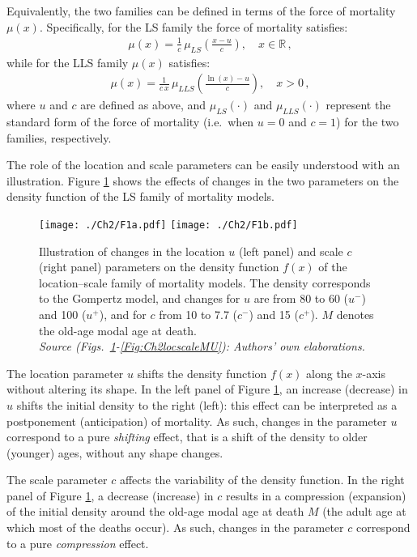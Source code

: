\documentclass[Thesis]{subfiles}
\begin{document}
Equivalently, the two families can be defined in terms of the force of mortality $\mu(x)$. Specifically, for the LS family the force of mortality satisfies:
\begin{eqnarray}\label{LSMmux}
\mu(x)= \frac{1}{c} \, \mu_{LS} \left (\frac{x-u}{c} \right ), \quad x\in\mathbb{R} \, ,
\end{eqnarray}
while for the LLS family $\mu(x)$ satisfies:
\begin{eqnarray}\label{LSLMmux}
\mu(x)=\frac{1}{c\,x} \, \mu_{LLS} \left (\frac{\ln(x)-u}{c} \right ),  \quad x > 0 \, ,
\end{eqnarray}
where $u$ and $c$ are defined as above, and $\mu_{LS}(\cdot)$ and $\mu_{LLS}(\cdot)$ represent the standard form of the force of mortality (i.e.~when $u=0$ and $c=1$) for the two families, respectively.

The role of the location and scale parameters can be easily understood with an illustration. Figure \ref{Fig:Ch2locscalepdf} shows the effects of changes in the two parameters on the density function of the LS family of mortality models. 

\begin{figure}[!ht]
	\centering
	\texttt{[image: ./Ch2/F1a.pdf]}
	\texttt{[image: ./Ch2/F1b.pdf]}
	
	\caption{Illustration of changes in the location $u$ (left panel) and scale $c$ (right panel) parameters on the density function $f(x)$ of the location--scale family of mortality models. The density corresponds to the Gompertz model, and changes for $u$ are from 80 to 60 ($u^-$) and 100 ($u^+$), and for $c$ from 10 to 7.7 ($c^-$) and 15 ($c^+$). $M$ denotes the old-age modal age at death.\\ \textit{Source (Figs.~\ref{Fig:Ch2locscalepdf}-\ref{Fig:Ch2locscaleMU}): Authors' own elaborations.}}\label{Fig:Ch2locscalepdf}

\end{figure}

The location parameter $u$ shifts the density function $f(x)$ along the $x$-axis without altering its shape. In the left panel of Figure \ref{Fig:Ch2locscalepdf}, an increase (decrease) in $u$ shifts the initial density to the right (left): this effect can be interpreted as a postponement (anticipation) of mortality. As such, changes in the parameter $u$ correspond to a pure \textit{shifting} effect, that is a shift of the density to older (younger) ages, without any shape changes.

The scale parameter $c$ affects the variability of the density function. In the right panel of Figure \ref{Fig:Ch2locscalepdf}, a decrease (increase) in $c$ results in a compression (expansion) of the initial density around the  old-age modal age at death $M$ (the adult age at which most of the deaths occur). As such, changes in the parameter $c$ correspond to a pure \textit{compression} effect. 
\end{document}
